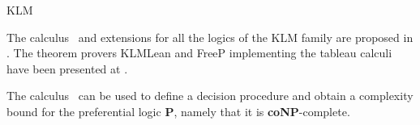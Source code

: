 \begin{entry}{KLM}
\begin{history}
  The calculus \calcoloP \ and extensions for all the logics of the KLM family are proposed in \cite{toclKLMpozz}. The theorem provers KLMLean and FreeP implementing the tableau calculi have been presented at \cite{tableaux2007pozz,aiia207pozz}.
 \end{history}

 \begin{technicalities}
The calculus \calcoloP \ can be used to define a decision procedure and
obtain  a complexity bound for the preferential logic {\bf P}, namely that it is
 {\bf coNP}-complete.
 \end{technicalities}



%
%
%
%
%
%
% 
%












\end{entry}

